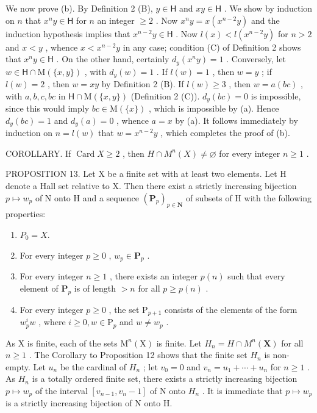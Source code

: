 We now prove (b). By Definition 2 (B), \(y \in \mathsf{H}\) and \(xy \in \mathsf{H}\) . We show by induction on \(n\) that \(x^n y \in \mathsf{H}\) for \(n\) an integer \(\geqslant 2\) . Now \(x^n y = x(x^{n-2}y)\) and the induction hypothesis implies that \(x^{n-2}y \in \mathsf{H}\) . Now \(l(x) < l(x^{n-2}y)\) for \(n > 2\) and \(x < y\) , whence \(x < x^{n-2}y\) in any case; condition (C) of Definition 2 shows that \(x^n y \in \mathsf{H}\) . On the other hand, certainly \(d_y(x^n y) = 1\) . Conversely, let \(w \in \mathsf{H} \cap \mathrm{M}(\{x, y\})\) , with \(d_y(w) = 1\) . If \(l(w) = 1\) , then \(w = y\) ; if \(l(w) = 2\) , then \(w = xy\) by Definition 2 (B). If \(l(w) \geqslant 3\) , then \(w = a(bc)\) , with \(a, b, c, bc\) in \(\mathsf{H} \cap \mathrm{M}(\{x, y\})\) (Definition 2 (C)). \(d_y(bc) = 0\) is impossible, since this would imply \(bc \in \mathrm{M}(\{x\})\) , which is impossible by (a). Hence \(d_y(bc) = 1\) and \(d_y(a) = 0\) , whence \(a = x\) by (a). It follows immediately by induction on \(n = l(w)\) that \(w = x^{n-2}y\) , which completes the proof of (b).

COROLLARY. If \(\operatorname{Card} X \geqslant 2\) , then \(H \cap M^n(X) \neq \varnothing\) for every integer \(n \geqslant 1\) .

PROPOSITION 13. Let X be a finite set with at least two elements. Let H denote a Hall set relative to X. Then there exist a strictly increasing bijection \(p \mapsto w_p\) of N onto H and a sequence \((\mathbf{P}_p)_{p \in \mathbf{N}}\) of subsets of H with the following properties:

\begin{enumerate}
\def\labelenumi{(\alph{enumi})}
\item
  \(P_{0} = X.\)
\item
  For every integer \(p \geqslant 0\) , \(w_{p} \in \mathbf{P}_{p}\) .
\item
  For every integer \(n \geqslant 1\) , there exists an integer \(p(n)\) such that every element of \(\mathbf{P}_p\) is of length \(> n\) for all \(p \geqslant p(n)\) .
\item
  For every integer \(p \geqslant 0\) , the set \(\mathrm{P}_{p+1}\) consists of the elements of the form \(w_p^i w\) , where \(i \geqslant 0, w \in \mathrm{P}_p\) and \(w \neq w_p\) .
\end{enumerate}

As X is finite, each of the sets \(\mathrm{M}^{n}(\mathrm{X})\) is finite. Let \(H_{n}=H\cap M^{n}(\mathbf{X})\) for all \(n\geqslant1\) . The Corollary to Proposition 12 shows that the finite set \(H_{n}\) is non-empty. Let \(u_{n}\) be the cardinal of \(H_{n}\) ; let \(v_{0}=0\) and \(v_{n}=u_{1}+\cdots+u_{n}\) for \(n\geqslant1\) . As \(H_{n}\) is a totally ordered finite set, there exists a strictly increasing bijection \(p\mapsto w_{p}\) of the interval \([v_{n-1},v_{n}-1]\) of N onto \(H_{n}\) . It is immediate that \(p\mapsto w_{p}\) is a strictly increasing bijection of N onto H.

